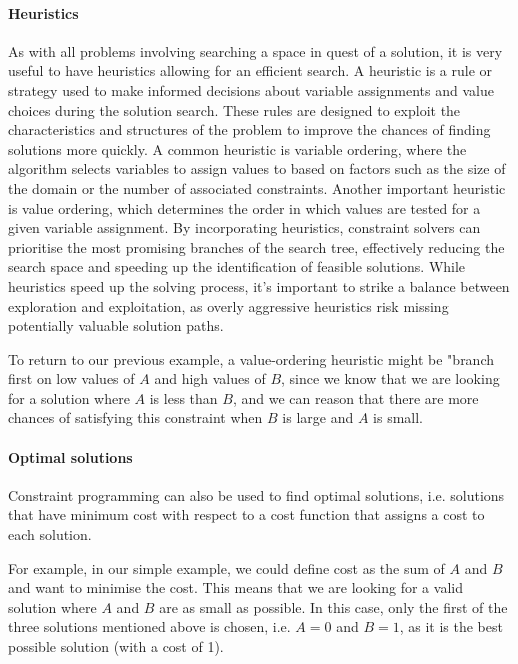 \paragraph{Heuristics}
As with all problems involving searching a space in quest of a solution, it is very useful to have heuristics allowing for an efficient search. A heuristic is a rule or strategy used to make informed decisions about variable assignments and value choices during the solution search. These rules are designed to exploit the characteristics and structures of the problem to improve the chances of finding solutions more quickly. A common heuristic is variable ordering, where the algorithm selects variables to assign values to based on factors such as the size of the domain or the number of associated constraints. Another important heuristic is value ordering, which determines the order in which values are tested for a given variable assignment. By incorporating heuristics, constraint solvers can prioritise the most promising branches of the search tree, effectively reducing the search space and speeding up the identification of feasible solutions. While heuristics speed up the solving process, it's important to strike a balance between exploration and exploitation, as overly aggressive heuristics risk missing potentially valuable solution paths.


To return to our previous example, a value-ordering heuristic might be "branch first on low values of $A$ and high values of $B$, since we know that we are looking for a solution where $A$ is less than $B$, and we can reason that there are more chances of satisfying this constraint when $B$ is large and $A$ is small.

\paragraph{Optimal solutions}
Constraint programming can also be used to find optimal solutions, i.e. solutions that have minimum cost with respect to a cost function that assigns a cost to each solution.

For example, in our simple example, we could define cost as the sum of $A$ and $B$ and want to minimise the cost. This means that we are looking for a valid solution where $A$ and $B$ are as small as possible. In this case, only the first of the three solutions mentioned above is chosen, i.e. $A=0$ and $B=1$, as it is the best possible solution (with a cost of 1).

